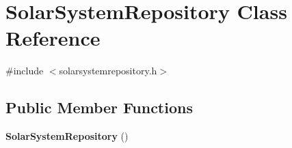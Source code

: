 \section{\-Solar\-System\-Repository \-Class \-Reference}
\label{d6/d91/classSolarSystemRepository}


{\ttfamily \#include $<$solarsystemrepository.\-h$>$}

\subsection*{\-Public \-Member \-Functions}
\begin{DoxyCompactItemize}
\item 
{\bf \-Solar\-System\-Repository} ()\label{d6/d91/classSolarSystemRepository_a589048d551ee6482941b6f33e7bb3216}


\end{DoxyCompactItemize}
